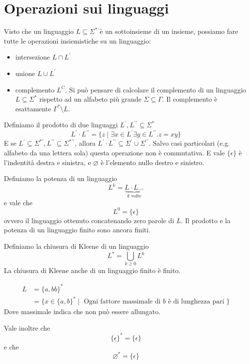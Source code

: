 \documentclass[12pt]{article}
\begin{document}
\tableofcontents
\newpage
\section{Operazioni sui linguaggi}
Visto che un linguaggio $L \subseteq \Sigma^*$ è un sottoinsieme di un insieme, possiamo fare tutte le operazioni insiemistiche su un linguaggio:
\begin{itemize}
	\item intersezione $L \cap L^\prime$
	\item unione $L \cup L^\prime$
	\item complemento $L^C$.
		Si può pensare di calcolare il complemento di un linguaggio $L \subseteq \Sigma^*$ rispetto ad un alfabeto più grande $\Sigma \subseteq \Gamma$.
		Il complemento è esattamente $\Gamma^* \setminus L$.
\end{itemize}

Definiamo il prodotto di due linguaggi $L^\prime, L^{\prime\prime} \subseteq \Sigma^*$
$$ L^\prime \cdot L^{\prime\prime} = \{ z \mid \exists x \in L^\prime \exists y \in L^{\prime\prime} . z = xy \} $$
E se $L^\prime \subseteq \Sigma^{*\prime}, L^{\prime\prime} \subseteq \Sigma^{*\prime\prime}$, allora $L^\prime \cdot L^{\prime\prime} \subseteq \Sigma^\prime \cup \Sigma^{\prime\prime}$.
Salvo casi particolari (e.g. alfabeto da una lettera sola) questa operazione non è commutativa.
E vale $\{ \epsilon \}$ è l'indentità destra e sinistra, e $\varnothing$ è l'elemento nullo destro e sinistro.

Definiamo la potenza di un linguaggio
$$ L^k = \underbrace{L \cdot L \dots}_{k \text{ volte}} $$
e vale che 
$$ L^0 = \{ \epsilon \} $$
ovvero il linguaggio ottenuto concatenando zero parole di $L$.
Il prodotto e la potenza di un linguaggio finito sono ancora finiti.

Definiamo la chiusura di Kleene di un linguaggio
$$ L^* = \bigcup_{k \geq 0} L^k $$
La chiusura di Kleene anche di un linguaggio finito è finito.
\begin{tcolorbox}
	\begin{align*}
		L &= \{ a, bb\}^* \\
		  & = \{ x \in \{a, b\}^* \mid \text{ Ogni fattore massimale di $b$ è di lunghezza pari }\}
	\end{align*}
	Dove massimale indica che non può essere allungato.
\end{tcolorbox}
Vale inoltre che
$$ \{\epsilon \}^* = \{ \epsilon \}$$
e che
$$ \varnothing^* = \{ \epsilon \} $$
\end{document}
